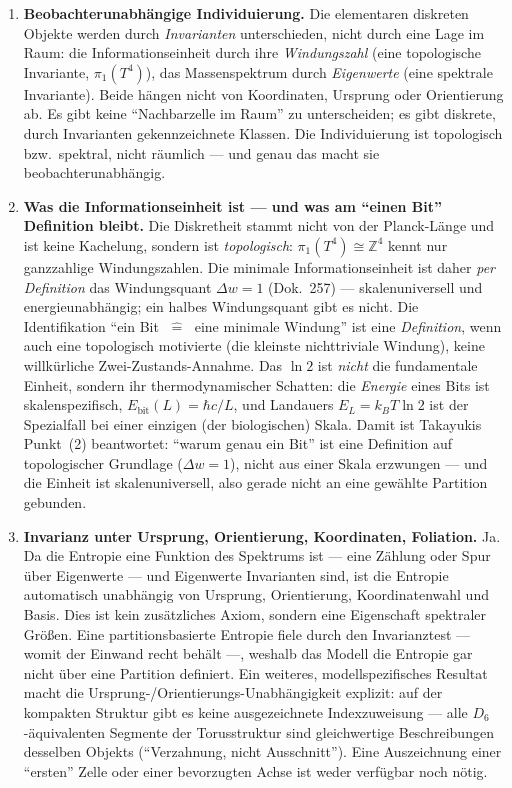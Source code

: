 \begin{enumerate}
\item \textbf{Beobachterunabhängige Individuierung.} Die elementaren diskreten Objekte
werden durch \emph{Invarianten} unterschieden, nicht durch eine Lage im Raum: die
Informationseinheit durch ihre \emph{Windungszahl} (eine topologische Invariante,
$\pi_1(T^4)$), das Massenspektrum durch \emph{Eigenwerte} (eine spektrale Invariante).
Beide hängen nicht von Koordinaten, Ursprung oder Orientierung ab. Es gibt keine
\enquote{Nachbarzelle im Raum} zu unterscheiden; es gibt diskrete, durch Invarianten
gekennzeichnete Klassen. Die Individuierung ist topologisch bzw.\ spektral, nicht
räumlich --- und genau das macht sie beobachterunabhängig.

\item \textbf{Was die Informationseinheit ist --- und was am \enquote{einen Bit}
Definition bleibt.} Die Diskretheit stammt nicht von der Planck-Länge und ist keine
Kachelung, sondern ist \emph{topologisch}: $\pi_1(T^4) \cong \mathbb{Z}^4$ kennt nur
ganzzahlige Windungszahlen. Die minimale Informationseinheit ist daher \emph{per
Definition} das Windungsquant $\Delta w = 1$ (Dok.~257) --- skalenuniversell und
energieunabhängig; ein halbes Windungsquant gibt es nicht. Die Identifikation
\enquote{ein Bit $\;\widehat{=}\;$ eine minimale Windung} ist eine \emph{Definition},
wenn auch eine topologisch motivierte (die kleinste nichttriviale Windung), keine
willkürliche Zwei-Zustands-Annahme. Das $\ln 2$ ist \emph{nicht} die fundamentale
Einheit, sondern ihr thermodynamischer Schatten: die \emph{Energie} eines Bits ist
skalenspezifisch, $E_\text{bit}(L) = \hbar c / L$, und Landauers $E_L = k_B T \ln 2$
ist der Spezialfall bei einer einzigen (der biologischen) Skala. Damit ist Takayukis
Punkt~(2) beantwortet: \enquote{warum genau ein Bit} ist eine Definition auf
topologischer Grundlage ($\Delta w = 1$), nicht aus einer Skala erzwungen --- und die
Einheit ist skalenuniversell, also gerade nicht an eine gewählte Partition gebunden.

\item \textbf{Invarianz unter Ursprung, Orientierung, Koordinaten, Foliation.} Ja. Da
die Entropie eine Funktion des Spektrums ist --- eine Zählung oder Spur über Eigenwerte
--- und Eigenwerte Invarianten sind, ist die Entropie automatisch unabhängig von
Ursprung, Orientierung, Koordinatenwahl und Basis. Dies ist kein zusätzliches Axiom,
sondern eine Eigenschaft spektraler Größen. Eine partitionsbasierte Entropie fiele
durch den Invarianztest --- womit der Einwand recht behält ---, weshalb das Modell die
Entropie gar nicht über eine Partition definiert. Ein weiteres, modellspezifisches
Resultat macht die Ursprung-/Orientierungs-Unabhängigkeit explizit: auf der kompakten
Struktur gibt es keine ausgezeichnete Indexzuweisung --- alle $D_6$-äquivalenten
Segmente der Torusstruktur sind gleichwertige Beschreibungen desselben Objekts
(\enquote{Verzahnung, nicht Ausschnitt}). Eine Auszeichnung einer \enquote{ersten}
Zelle oder einer bevorzugten Achse ist weder verfügbar noch nötig.


\end{enumerate}

